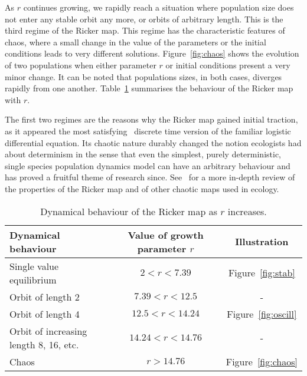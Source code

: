 \documentclass[12pt]{article}
\newcommand{\ra}[1]{\renewcommand{\arraystretch}{#1}}
\begin{document}
	As $r$ continues growing, we rapidly reach a situation where population size does not enter any stable orbit any more, or orbits of arbitrary length. This is the third regime of the Ricker map. This regime has the characteristic features of chaos, where a small change in the value of the parameters or the initial conditions leads to very different solutions. Figure~\ref{fig:chaos} shows the evolution of two populations when either parameter $r$ or initial conditions present a very minor change. It can be noted that populations sizes, in both cases, diverges rapidly from one another. Table~\ref{valuesr} summarises the behaviour of the Ricker map with $r$.
	
	The first two regimes are the reasons why the Ricker map gained initial traction, as it appeared the most satisfying~\cite{cook1965oscillation} discrete time version of the familiar logistic differential equation. Its chaotic nature durably changed the notion ecologists had about determinism in the sense that even the simplest, purely deterministic, single species population dynamics model can have an arbitrary behaviour and has proved a fruitful theme of research since. See~\cite{may1975biological} for a more in-depth review of the properties of the Ricker map and of other chaotic maps used in ecology. 
	
	\begin{table}[htb]
		\centering
		\vspace{15mm}
		\ra{1.3}
		\begin{tabular}{@{}lcc@{}} \toprule
			Dynamical behaviour & Value of growth parameter $r$ &  Illustration \\ \midrule
			Single value equilibrium & $2<r<7.39$ & Figure~\ref{fig:stab}\\ 
			Orbit of length 2 & $7.39<r<12.5$ & - \\ 
			Orbit of length 4 & $12.5<r<14.24$ & Figure~\ref{fig:oscill}\\ 
			Orbit of increasing length 8, 16, etc. & $14.24<r<14.76$ & - \\ 
			Chaos &  $r>14.76$ &  Figure~\ref{fig:chaos} \\ \bottomrule
		\end{tabular}
		\caption{Dynamical behaviour of the Ricker map as $r$ increases.}
		\label{valuesr}
		\vspace{5mm}
	\end{table}	
	
\end{document}
